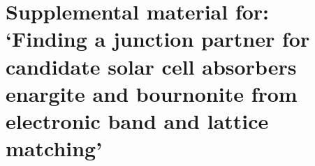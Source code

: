 \documentclass[11pt, twoside]{report}
\begin{document}
\section{Supplemental material for: `Finding a junction partner for candidate solar cell absorbers enargite and bournonite from electronic band and lattice matching'}\label{jp_appendix}



\end{document}
